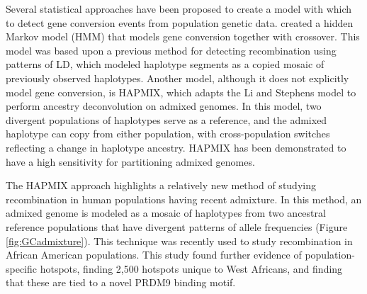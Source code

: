Several statistical approaches have been proposed to create a model with which to detect gene conversion events from population genetic data.
\citet{Gay2007} created a hidden Markov model (HMM) that models gene conversion together with crossover.
This model was based upon a previous method for detecting recombination using patterns of LD, which modeled haplotype segments as a copied mosaic of previously observed haplotypes\cite{Li2003}.
Another model, although it does not explicitly model gene conversion, is HAPMIX\cite{Price2009}, which adapts the Li and Stephens model to perform ancestry deconvolution on admixed genomes.
In this model, two divergent populations of haplotypes serve as a reference, and the admixed haplotype can copy from either population, with cross-population switches reflecting a change in haplotype ancestry.
HAPMIX has been demonstrated to have a high sensitivity for partitioning admixed genomes\cite{Price2009}.

The HAPMIX approach highlights a relatively new method of studying recombination in human populations having recent admixture.
In this method, an admixed genome is modeled as a mosaic of haplotypes from two ancestral reference populations that have divergent patterns of allele frequencies (Figure \ref{fig:GCadmixture}).
This technique was recently used to study recombination in African American populations\cite{Hinch2011}.
This study found further evidence of population-specific hotspots, finding 2,500 hotspots unique to West Africans, and finding that these are tied to a novel PRDM9 binding motif.


